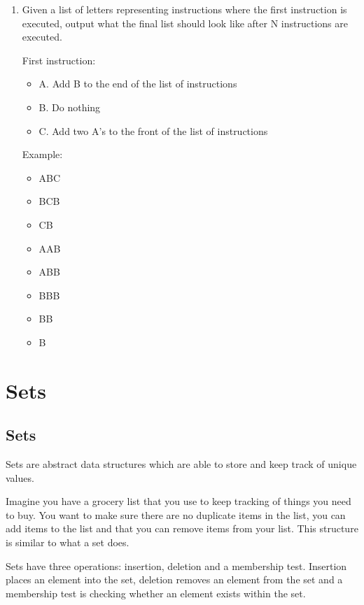 \documentclass[11pt,oneside]{book}
\begin{document}
\begin{enumerate}
\item Given a list of letters representing instructions where the first instruction is executed, output what the final list should look like after N instructions are executed.

First instruction:

\begin{itemize}
\item A. Add B to the end of the list of instructions
\item B. Do nothing
\item C. Add two A's to the front of the list of instructions
\end{itemize}

Example:

\begin{itemize}
\item ABC
\item BCB
\item CB
\item AAB
\item ABB
\item BBB
\item BB
\item B
\end{itemize}
\end{enumerate}

    \chapter{ Sets }
        \section{ Sets }
        

Sets are abstract data structures which are able to store and keep track of unique values.

Imagine you have a grocery list that you use to keep tracking of things you need to buy. You want to make sure there are no duplicate items in the list, you can add items to the list and that you can remove items from your list. This structure is similar to what a set does.

Sets have three operations: insertion, deletion and a membership test. Insertion places an element into the set, deletion removes an element from the set and a membership test is checking whether an element exists within the set.
\end{document}
